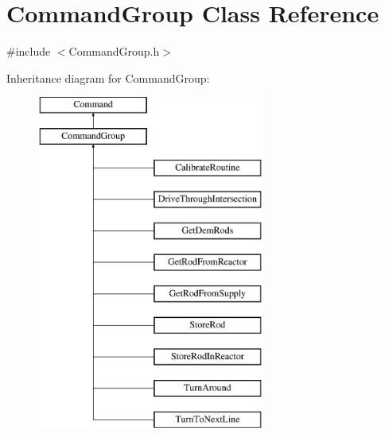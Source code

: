 \hypertarget{classCommandGroup}{\section{Command\-Group Class Reference}
\label{classCommandGroup}
}


{\ttfamily \#include $<$Command\-Group.\-h$>$}

Inheritance diagram for Command\-Group\-:\begin{figure}[H]
\begin{center}
\leavevmode
\includegraphics[height=11.000000cm]{classCommandGroup}
\end{center}
\end{figure}
